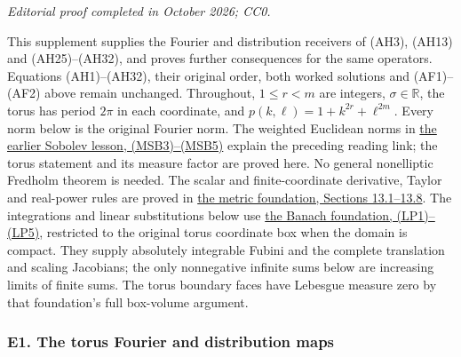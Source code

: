 \documentclass[
  11pt,
]{article}
\begin{document}
\emph{Editorial proof completed in October 2026; CC0.}

This supplement supplies the Fourier and distribution receivers of
(AH3), (AH13) and (AH25)--(AH32), and proves further consequences for
the same operators. Equations (AH1)--(AH32), their original order, both
worked solutions and (AF1)--(AF2) above remain unchanged. Throughout,
\(1\leq r<m\) are integers, \(\sigma\in\mathbb R\), the torus has period
\(2\pi\) in each coordinate, and \(p(k,\ell)=1+k^{2r}+\ell^{2m}\). Every
norm below is the original Fourier norm. The weighted Euclidean norms in
\href{mixed-sobolev-mapping.pdf}{the earlier Sobolev lesson,
(MSB3)--(MSB5)} explain the preceding reading link; the torus statement
and its measure factor are proved here. No general nonelliptic Fredholm
theorem is needed. The scalar and finite-coordinate derivative, Taylor
and real-power rules are proved in
\href{metric-foundation-bridges.pdf\#section*.74}{the
metric foundation, Sections 13.1--13.8}. The integrations and linear
substitutions below use
\href{banach-foundation-bridges.pdf\#section*.83}{the
Banach foundation, (LP1)--(LP5)}, restricted to the original torus
coordinate box when the domain is compact. They supply absolutely
integrable Fubini and the complete translation and scaling Jacobians;
the only nonnegative infinite sums below are increasing limits of finite
sums. The torus boundary faces have Lebesgue measure zero by that
foundation's full box-volume argument.

\subsubsection{E1. The torus Fourier and distribution
maps}\label{e1.-the-torus-fourier-and-distribution-maps}
\end{document}
